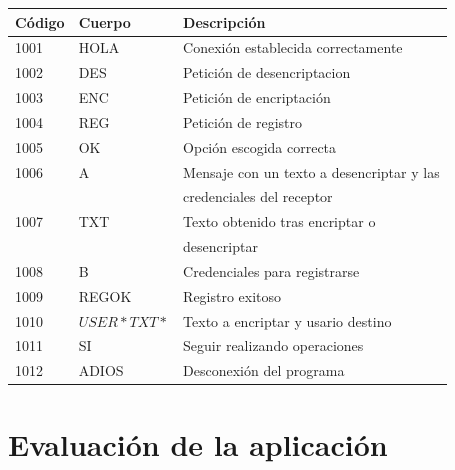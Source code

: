 \documentclass[11pt]{article}
\begin{document}
\begin{table}[h]
\centering
\begin{tabular}{|l|l|l|}
\hline
{Código} & {Cuerpo} & {Descripción}                        \\ \hline
1001                          & HOLA                          & Conexión establecida correctamente                        \\ \hline
1002                          & DES                           & Petición de desencriptacion                                     \\ \hline
1003                          & ENC                           & Petición de encriptación                                       \\ \hline
1004                          & REG                           & Petición de registro                                      \\ \hline
1005                          & OK                        	  & Opción escogida correcta                                      \\ \hline
1006                          & A                             & Mensaje con un texto a desencriptar y las\\  
							  & 							  & credenciales del receptor                                 \\ \hline
1007                          & TXT                           & Texto obtenido tras encriptar o \\
							  &                               &desencriptar \\ \hline
1008                          & B                         	  & Credenciales para registrarse                             \\ \hline
1009                          & REGOK                         & Registro exitoso                               \\ \hline
1010                          & $USER*TXT*$                   & Texto a encriptar y usario destino                            \\ \hline
1011                          & SI                            & Seguir realizando operaciones                                   \\ \hline
1012                          & ADIOS                         & Desconexión del programa                                  \\ \hline
\end{tabular}
\end{table}

\newpage
\section{Evaluaci\'on de la aplicaci\'on}
\end{document}
